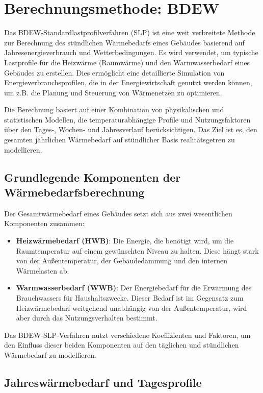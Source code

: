 \section{Berechnungsmethode: BDEW}
\label{sec:bdew}

Das BDEW-Standardlastprofilverfahren (SLP) ist eine weit verbreitete Methode zur Berechnung des stündlichen Wärmebedarfs eines Gebäudes basierend auf Jahresenergieverbrauch und Wetterbedingungen. Es wird verwendet, um typische Lastprofile für die Heizwärme (Raumwärme) und den Warmwasserbedarf eines Gebäudes zu erstellen. Dies ermöglicht eine detaillierte Simulation von Energieverbrauchsprofilen, die in der Energiewirtschaft genutzt werden können, um z.B. die Planung und Steuerung von Wärmenetzen zu optimieren.

Die Berechnung basiert auf einer Kombination von physikalischen und statistischen Modellen, die temperaturabhängige Profile und Nutzungsfaktoren über den Tages-, Wochen- und Jahresverlauf berücksichtigen. Das Ziel ist es, den gesamten jährlichen Wärmebedarf auf stündlicher Basis realitätsgetreu zu modellieren.

\subsection{Grundlegende Komponenten der Wärmebedarfsberechnung}
Der Gesamtwärmebedarf eines Gebäudes setzt sich aus zwei wesentlichen Komponenten zusammen:

\begin{itemize}
    \item \textbf{Heizwärmebedarf (HWB)}: Die Energie, die benötigt wird, um die Raumtemperatur auf einem gewünschten Niveau zu halten. Diese hängt stark von der Außentemperatur, der Gebäudedämmung und den internen Wärmelasten ab.
    \item \textbf{Warmwasserbedarf (WWB)}: Der Energiebedarf für die Erwärmung des Brauchwassers für Haushaltszwecke. Dieser Bedarf ist im Gegensatz zum Heizwärmebedarf weitgehend unabhängig von der Außentemperatur, wird aber durch das Nutzungsverhalten bestimmt.
\end{itemize}

Das BDEW-SLP-Verfahren nutzt verschiedene Koeffizienten und Faktoren, um den Einfluss dieser beiden Komponenten auf den täglichen und stündlichen Wärmebedarf zu modellieren.

\subsection{Jahreswärmebedarf und Tagesprofile}

